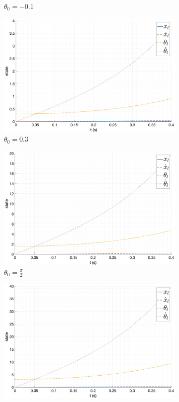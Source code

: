 \begin{figure}[ht!]
\begin{subfigure}[b]{0.45\textwidth}
        \caption{$\theta_0 = -0.1$}
    \end{subfigure}
    \begin{subfigure}[b]{0.45\textwidth}
        \includegraphics[width=\textwidth]{media/plots/free_motion/state_lin_4.png}
        \caption{$\theta_0 = 0.3$}
    \end{subfigure}
    \begin{subfigure}[b]{0.45\textwidth}
        \includegraphics[width=\textwidth]{media/plots/free_motion/state_lin_5.png}
        \caption{$\theta_0 = \frac{\pi}{2}$}
    \end{subfigure}
    \begin{subfigure}[b]{0.45\textwidth}
        \includegraphics[width=\textwidth]{media/plots/free_motion/state_lin_6.png}

\end{subfigure}
\end{figure}
